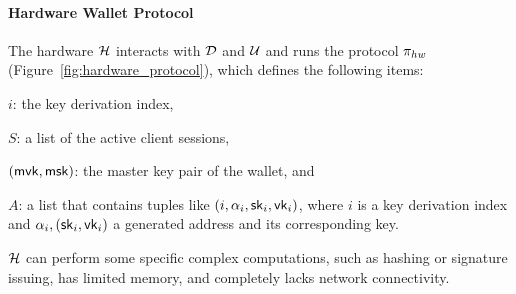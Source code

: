 \paragraph{Hardware Wallet Protocol}\label{subsec:hardware-protocol}
The hardware $\mathcal{H}$ interacts with $\mathcal{D}$ and $\mathcal{U}$ and runs the
protocol $\pi_{hw}$ (Figure~\ref{fig:hardware_protocol}), which defines the
following items:
\begin{inparaenum}[i)]
    \item $i$: the key derivation index,
    \item $S$: a list of the active client sessions,
    \item $(\mathsf{mvk}, \mathsf{msk})$: the master key pair of the wallet, and
    \item $A$: a list that contains tuples like $(i, \alpha_i, \mathsf{sk}_i,
        \mathsf{vk}_i)$, where $i$ is a key derivation index and $\alpha_i,
        (\mathsf{sk}_i, \mathsf{vk}_i)$ a generated address and its corresponding key.
\end{inparaenum}
$\mathcal{H}$ can perform some specific complex computations, such as hashing or
signature issuing, has limited memory, and completely lacks network connectivity.

